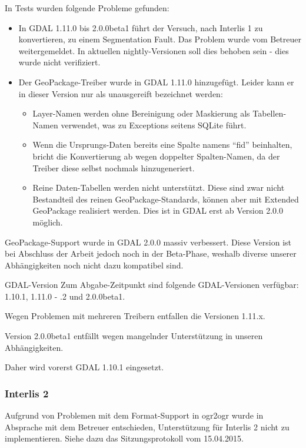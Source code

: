 In Tests wurden folgende Probleme gefunden:
\begin{itemize}
\item In GDAL 1.11.0 bis 2.0.0beta1 führt der Versuch, nach Interlis 1 zu konvertieren, zu einem Segmentation Fault. Das Problem wurde vom Betreuer weitergemeldet. In aktuellen nightly-Versionen soll dies behoben sein - dies wurde nicht verifiziert.
\item Der GeoPackage-Treiber wurde in GDAL 1.11.0 hinzugefügt. Leider kann er in dieser Version nur als unausgereift bezeichnet werden:
  \begin{itemize}
  \item Layer-Namen werden ohne Bereinigung oder Maskierung als Tabellen-Namen verwendet, was zu Exceptions seitens SQLite führt.
  \item Wenn die Ursprungs-Daten bereits eine Spalte namens ``fid'' beinhalten, bricht die Konvertierung ab wegen doppelter Spalten-Namen, da der Treiber diese selbst nochmals hinzugeneriert.
  \item Reine Daten-Tabellen werden nicht unterstützt. Diese sind zwar nicht Bestandteil des reinen GeoPackage-Standards, können aber mit Extended GeoPackage realisiert werden. Dies ist in GDAL erst ab Version 2.0.0 möglich.
  \end{itemize}
\end{itemize}

GeoPackage-Support wurde in GDAL 2.0.0 massiv verbessert. Diese Version ist bei Abschluss der Arbeit jedoch noch in der Beta-Phase, weshalb diverse unserer Abhängigkeiten noch nicht dazu kompatibel sind.

\begin{decision}[label=dec:pd:gdal-version]{GDAL-Version}
Zum Abgabe-Zeitpunkt sind folgende GDAL-Versionen verfügbar: 1.10.1, 1.11.0 - .2 und 2.0.0beta1.

Wegen Problemen mit mehreren Treibern entfallen die Versionen 1.11.x.

Version 2.0.0beta1 entfällt wegen mangelnder Unterstützung in unseren Abhängigkeiten.

Daher wird vorerst GDAL 1.10.1 eingesetzt.
\end{decision}

\subsubsection{Interlis 2}
Aufgrund von Problemen mit dem Format-Support in ogr2ogr wurde in Absprache mit dem Betreuer entschieden, Unterstützung für Interlis 2 nicht zu implementieren. Siehe dazu das Sitzungsprotokoll vom 15.04.2015.

